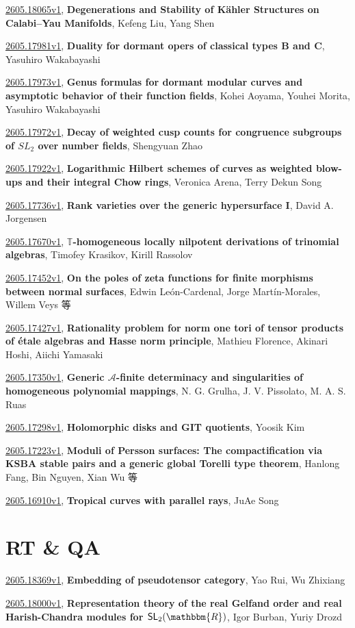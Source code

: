 \documentclass[9pt, a4paper]{article}
\theoremstyle{plain}
\theoremstyle{definition}
\theoremstyle{remark}
\newcommand{\arxiv}[3]{\href{https://arxiv.org/abs/#1}{#1}, \textbf{\textcolor{arxivblue}{#2}}, #3}
\begin{document}
\arxiv{2605.18065v1}{Degenerations and Stability of Kähler Structures on Calabi--Yau Manifolds}{Kefeng Liu, Yang Shen}

\arxiv{2605.17981v1}{Duality for dormant opers of classical types B and C}{Yasuhiro Wakabayashi}

\arxiv{2605.17973v1}{Genus formulas for dormant modular curves and asymptotic behavior of their function fields}{Kohei Aoyama, Youhei Morita, Yasuhiro Wakabayashi}

\arxiv{2605.17972v1}{Decay of weighted cusp counts for congruence subgroups of $SL_2$ over number fields}{Shengyuan Zhao}

\arxiv{2605.17922v1}{Logarithmic Hilbert schemes of curves as weighted blow-ups and their integral Chow rings}{Veronica Arena, Terry Dekun Song}

\arxiv{2605.17736v1}{Rank varieties over the generic hypersurface I}{David A. Jorgensen}

\arxiv{2605.17670v1}{$\mathbb T$-homogeneous locally nilpotent derivations of trinomial algebras}{Timofey Krasikov, Kirill Rassolov}

\arxiv{2605.17452v1}{On the poles of zeta functions for finite morphisms between normal surfaces}{Edwin León-Cardenal, Jorge Martín-Morales, Willem Veys 等}

\arxiv{2605.17427v1}{Rationality problem for norm one tori of tensor products of étale algebras and Hasse norm principle}{Mathieu Florence, Akinari Hoshi, Aiichi Yamasaki}

\arxiv{2605.17350v1}{Generic $\mathcal{A}$-finite determinacy and singularities of homogeneous polynomial mappings}{N. G. Grulha, J. V. Pissolato, M. A. S. Ruas}

\arxiv{2605.17298v1}{Holomorphic disks and GIT quotients}{Yoosik Kim}

\arxiv{2605.17223v1}{Moduli of Persson surfaces: The compactification via KSBA stable pairs and a generic global Torelli type theorem}{Hanlong Fang, Bin Nguyen, Xian Wu 等}

\arxiv{2605.16910v1}{Tropical curves with parallel rays}{JuAe Song}


\section{RT \& QA}
\arxiv{2605.18369v1}{Embedding of pseudotensor category}{Yao Rui, Wu Zhixiang}

\arxiv{2605.18000v1}{Representation theory of the real Gelfand order and real Harish-Chandra modules for $\mathsf{SL}_2(\mathbbm{R})$}{Igor Burban, Yuriy Drozd}
\end{document}
